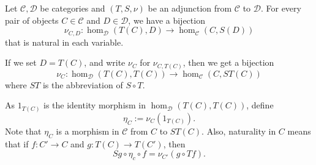 \documentclass[12pt]{article}
\begin{document}
Let $\mathcal{C},\mathcal{D}$ be categories and $(T,S,\nu)$ be an adjunction from $\mathcal{C}$ to $\mathcal{D}$.  For every pair of objects $C\in\mathcal{C}$ and $D\in\mathcal{D}$, we have a bijection
\begin{equation}
\nu_{C,D}:\hom_{\mathcal{D}}(T(C),D) \longrightarrow \hom_{\mathcal{C}}(C,S(D))
\end{equation}
that is natural in each variable.

If we set $D=T(C)$, and write $\nu_C$ for $\nu_{C,T(C)}$, then we get a bijection 
$$\nu_C:\hom_{\mathcal{D}}(T(C),T(C)) \longrightarrow \hom_{\mathcal{C}}(C,ST(C))$$ where $ST$ is the abbreviation of $S\circ T$.

As $1_{T(C)}$ is the identity morphism in $\hom_{\mathcal{D}}(T(C),T(C))$, define 
\begin{equation}
\eta_C:=\nu_C(1_{T(C)}).
\end{equation}  
Note that $\eta_C$ is a morphism in $\mathcal{C}$ from $C$ to $ST(C)$.  Also, naturality in $C$ means that if $f:C'\to C$ and $g:T(C)\to T(C')$, then 
\begin{equation}
Sg\circ \eta_c \circ f=\nu_{C'}(g\circ Tf).
\end{equation}
\end{document}
